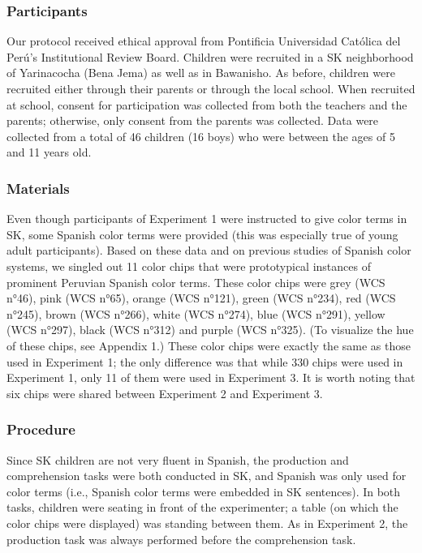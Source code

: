 \documentclass[floatsintext,man]{apa6}
\theoremstyle{definition}
\theoremstyle{definition}
\theoremstyle{definition}
\theoremstyle{remark}
\begin{document}
\subsubsection{Participants}\label{participants-2}

Our protocol received ethical approval from Pontificia Universidad
Católica del Perú's Institutional Review Board. Children were recruited
in a SK neighborhood of Yarinacocha (Bena Jema) as well as in Bawanisho.
As before, children were recruited either through their parents or
through the local school. When recruited at school, consent for
participation was collected from both the teachers and the parents;
otherwise, only consent from the parents was collected. Data were
collected from a total of 46 children (16 boys) who were between the
ages of 5 and 11 years old.

\subsubsection{Materials}\label{materials-2}

Even though participants of Experiment 1 were instructed to give color
terms in SK, some Spanish color terms were provided (this was especially
true of young adult participants). Based on these data and on previous
studies of Spanish color systems, we singled out 11 color chips that
were prototypical instances of prominent Peruvian Spanish color terms.
These color chips were grey (WCS n°46), pink (WCS n°65), orange (WCS
n°121), green (WCS n°234), red (WCS n°245), brown (WCS n°266), white
(WCS n°274), blue (WCS n°291), yellow (WCS n°297), black (WCS n°312) and
purple (WCS n°325). (To visualize the hue of these chips, see Appendix
1.) These color chips were exactly the same as those used in Experiment
1; the only difference was that while 330 chips were used in Experiment
1, only 11 of them were used in Experiment 3. It is worth noting that
six chips were shared between Experiment 2 and Experiment 3.

\subsubsection{Procedure}\label{procedure-2}

Since SK children are not very fluent in Spanish, the production and
comprehension tasks were both conducted in SK, and Spanish was only used
for color terms (i.e., Spanish color terms were embedded in SK
sentences). In both tasks, children were seating in front of the
experimenter; a table (on which the color chips were displayed) was
standing between them. As in Experiment 2, the production task was
always performed before the comprehension task.
\end{document}
